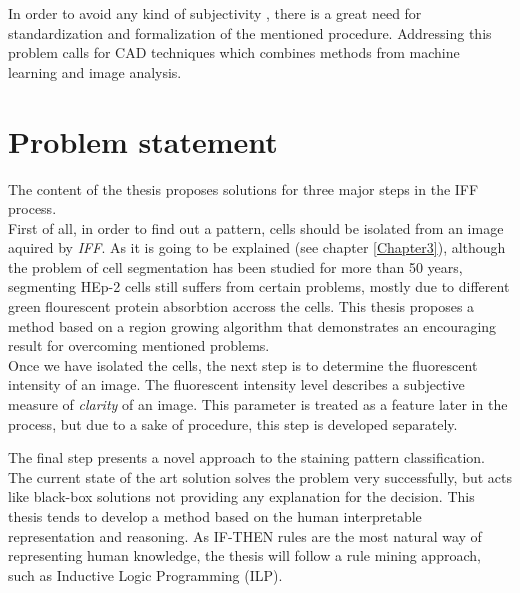 In order to avoid any kind of subjectivity , there is a great need for standardization and formalization of the mentioned procedure. Addressing this problem calls for CAD techniques which combines methods from machine learning and image analysis.

\section{Problem statement}

The content of the thesis proposes solutions for three major steps in the IFF process. \\

First of all, in order to find out a  pattern, cells should be isolated from an image aquired by \textit{IFF}. As it is going to be explained (see chapter \ref{Chapter3}), although the problem of cell segmentation has been studied for more than 50 years, segmenting HEp-2 cells still suffers from certain problems, mostly due to different green flourescent protein absorbtion accross the cells. This thesis proposes a method based on a region growing algorithm that demonstrates an encouraging result for overcoming mentioned problems. \\

Once we have isolated the cells, the next step is to determine the fluorescent intensity of an image. The fluorescent intensity level describes a subjective measure of \textit{clarity} of an image. This parameter is treated as a feature later in the process, but due to a sake of procedure, this step is developed separately. 

The final step presents a novel approach to the staining pattern classification. The current state of the art solution solves the problem very successfully, but acts like  black-box solutions not providing any explanation for the decision. This thesis tends to develop a method based on the human interpretable representation and reasoning. As IF-THEN rules are the most natural way of representing human knowledge,  the thesis will follow a rule mining approach, such as Inductive Logic Programming (ILP). \\